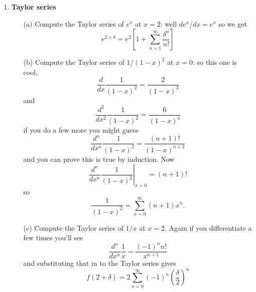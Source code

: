 \documentclass[11pt,a4paper]{scrartcl}
\begin{document}
\begin{enumerate}
	\item \textbf{Taylor series}
	\begin{itemize}
	\item[(a)] Compute the Taylor series of $e^x$ at $x=2$: well $de^x/dx=e^x$ so we get
          \begin{equation}
            e^{2+\delta}=e^2\left[1+\sum_{n=1}^\infty\frac{\delta^n}{n!}\right]
          \end{equation}
	\item[(b)] Compute the Taylor series of $1/(1-x)^2$ at $x=0$: so this one is cool,
          \begin{equation}
            \frac{d}{dx}\frac{1}{(1-x)^2}=\frac{2}{(1-x)^3}
          \end{equation}
          and
          \begin{equation}
            \frac{d^2}{dx^2}\frac{1}{(1-x)^2}=\frac{6}{(1-x)^4}
          \end{equation}
          if you do a few more you might guess
          \begin{equation}
            \frac{d^n}{dx^n}\frac{1}{(1-x)^2}=\frac{(n+1)!}{(1-x)^{n+2}}
          \end{equation}
          and you can prove this is true by induction. Now
          \begin{equation}
            \left.\frac{d^n}{dx^n}\frac{1}{(1-x)^2}\right|_{x=0}=(n+1)!
          \end{equation}
          so
          \begin{equation}
            \frac{1}{(1-x)^2}=\sum_{n=0}^{\infty} (n+1)x^n.
          \end{equation}
	  \item[(c)] Compute the Taylor series of $1/x$ at $x=2$. Again if you differentiate a few times you'll see
            \begin{equation}
              \frac{d^n}{dx^n}\frac{1}{x}=\frac{(-1)^nn!}{x^{n+1}}
            \end{equation}
            and substituting that in to the Taylor series gives
            \begin{equation}
              f(2+\delta)	= 2\sum_{n=0}^{\infty} (-1)^n \left(\frac{\delta}{2}\right)^n
            \end{equation}
            
	\end{itemize}
	
        
\end{enumerate}
\end{document}
